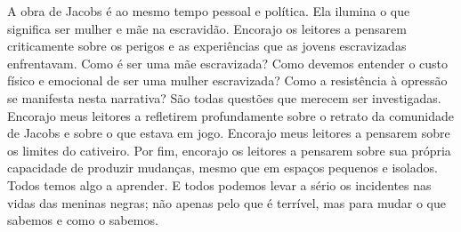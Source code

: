 A obra de Jacobs é ao mesmo tempo pessoal e política. Ela ilumina o que
significa ser mulher e mãe na escravidão. Encorajo os leitores a
pensarem criticamente sobre os perigos e as experiências que as jovens
escravizadas enfrentavam. Como é ser uma mãe escravizada? Como devemos
entender o custo físico e emocional de ser uma mulher escravizada? Como
a resistência à opressão se manifesta nesta narrativa? São todas
questões que merecem ser investigadas. Encorajo meus leitores a
refletirem profundamente sobre o retrato da comunidade de Jacobs e sobre
o que estava em jogo. Encorajo meus leitores a pensarem sobre os limites
do cativeiro. Por fim, encorajo os leitores a pensarem sobre sua própria
capacidade de produzir mudanças, mesmo que em espaços pequenos e
isolados. Todos temos algo a aprender. E todos podemos levar a sério os
incidentes nas vidas das meninas negras; não apenas pelo que é terrível,
mas para mudar o que sabemos e como o sabemos.
